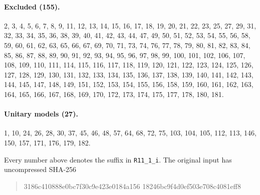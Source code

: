 \documentclass[11pt,a4paper]{article}
\begin{document}
\paragraph{Excluded (155).} 2, 3, 4, 5, 6, 7, 8, 9, 11, 12, 13, 14, 15, 16, 17, 18, 19, 20, 21, 22, 23, 25, 27, 29, 31, 32, 33, 34, 35, 36, 38, 39, 40, 41, 42, 43, 44, 47, 49, 50, 51, 52, 53, 54, 55, 56, 58, 59, 60, 61, 62, 63, 65, 66, 67, 69, 70, 71, 73, 74, 76, 77, 78, 79, 80, 81, 82, 83, 84, 85, 86, 87, 88, 89, 90, 91, 92, 93, 94, 95, 96, 97, 98, 99, 100, 101, 102, 106, 107, 108, 109, 110, 111, 114, 115, 116, 117, 118, 119, 120, 121, 122, 123, 124, 125, 126, 127, 128, 129, 130, 131, 132, 133, 134, 135, 136, 137, 138, 139, 140, 141, 142, 143, 144, 145, 147, 148, 149, 151, 152, 153, 154, 155, 156, 158, 159, 160, 161, 162, 163, 164, 165, 166, 167, 168, 169, 170, 172, 173, 174, 175, 177, 178, 180, 181.

\paragraph{Unitary models (27).} 1, 10, 24, 26, 28, 30, 37, 45, 46, 48, 57, 64, 68, 72, 75, 103, 104, 105, 112, 113, 146, 150, 157, 171, 176, 179, 182.

Every number above denotes the suffix in \texttt{R11\_1\_i}. The original
input has uncompressed SHA-256
\begin{quote}\small\ttfamily
3186c410888e0bc7f30c9e423e0184a156\linebreak
18246bc9f4d0ef503e708c4081eff8
\end{quote}
\end{document}
